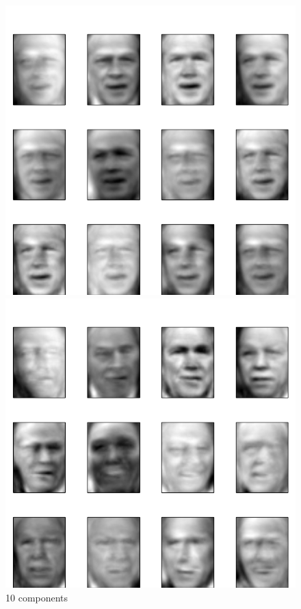 \documentclass{article}
\begin{document}
\begin{enumerate}
\begin{figure}[!htb]
	  \includegraphics[width=\linewidth]{../images/reconstructed10.png}
	  \caption{10 components}
	\endminipage\hfill
	  \includegraphics[width=\linewidth]{../images/reconstructed50.png}

\end{figure}
\end{enumerate}
\end{document}
